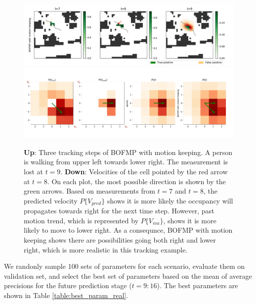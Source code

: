 \begin{figure}[ht]
\centering
\includegraphics[width=\textwidth]{figures/moving_average_tracking.png}
\includegraphics[width=\textwidth]{figures/moving_average_tracking_velocities_1.png}
\caption{\textbf{Up}: Three tracking steps of BOFMP with motion keeping. A person is walking from upper left towards lower right. The measurement is lost at $t=9$. \textbf{Down}: Velocities of the cell pointed by the red arrow at $t=8$. On each plot, the most possible direction is shown by the green arrows. Based on measurements from $t=7$ and $t=8$, the predicted velocity $P\{V_{pred}\}$ shows it is more likely the occupancy will propagates towards right for the next time step. However, past motion trend, which is represented by $P\{V_{ma}\}$, shows it is more likely to move to lower right. As a consequnce, BOFMP with motion keeping shows there are possibilities going both right and lower right, which is more realistic in this tracking example.}
\label{fig:keep_motion_idea}
\end{figure}


We randonly sample 100 sets of parameters for each scenario, evaluate them on validation set, and select the best set of parameters based on the mean of average precisions for the future prediction stage ($t=9:16$). The best parameters are shown in Table \ref{table:best_param_real}.

